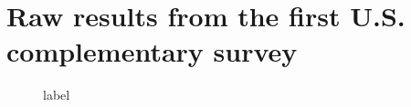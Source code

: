 \section{Raw results from the first U.S. complementary survey}

\begin{figure}[h!]
    \caption{label}\label{fig:vars}
\end{figure}
